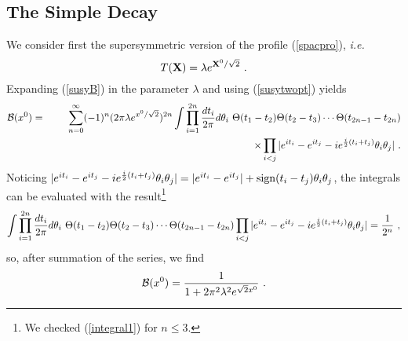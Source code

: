 \documentclass[a4paper,12pt]{article}
\begin{document}
\subsection{The Simple Decay}
We consider first the supersymmetric version of the profile (\ref{spacpro}), {\it i.e.}
\begin{equation}
T({\bf X}) = \lambda e^{{\bf X}^0/\sqrt{2}}~.
\label{susyexp}
\end{equation}
Expanding (\ref{susyB}) in the parameter $\lambda$ and using (\ref{susytwopt}) 
yields
\begin{eqnarray}
{\cal B}(x^0) &=& \sum_{n=0}^\infty (-1)^n
(2\pi\lambda e^{x^0/\sqrt{2}})^{2n} \int
\prod_{i=1}^{2n}{dt_i\over 2\pi} d\theta_i  ~ 
\Theta(t_1-t_2) \Theta(t_2-t_3) \cdots \Theta(t_{2n-1}-t_{2n}) \nonumber \\
&& \hspace{7cm}\times \prod_{i<j} | e^{it_i}-e^{it_j} -
i e^{\frac{i}{2} (t_i+t_j)} \theta_i \theta_j |~.
\end{eqnarray}
Noticing $| e^{it_i}-e^{it_j} - i e^{\frac{i}{2} (t_i+t_j)} 
\theta_i \theta_j | = | e^{it_i}-e^{it_j}| 
+ {\rm sign} ( t_i-t_j) \theta_i \theta_j$,
the integrals 
can be evaluated with the result\footnote{
We checked (\ref{integral1}) for $n \leq3$.} 
\begin{equation}
\int \prod_{i=1}^{2n}{dt_i\over 2\pi} d\theta_i  ~ 
\Theta(t_1-t_2) \Theta(t_2-t_3) \cdots \Theta(t_{2n-1}-t_{2n})
\prod_{i<j} | e^{it_i}-e^{it_j} - i e^{\frac{i}{2} (t_i+t_j)} 
\theta_i \theta_j | = {1\over 2^n}~,
\label{integral1}
\end{equation}
so, after summation of the series, we find
\begin{equation}
{\cal B}(x^0) = {1 \over 1+ 2\pi^2\lambda^2 e^{\sqrt{2}x^0}}~.
\label{susyBres}
\end{equation}
\end{document}
